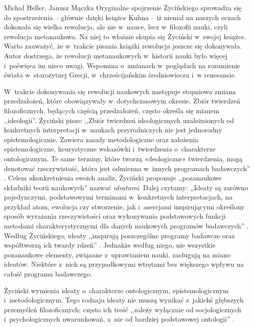 \begin{newrevplenv2auth}{Michał Heller, Janusz Mączka}
Oryginalne spojrzenie Życińskiego sprowadza się do spostrzeżenia -- głównie dzięki książce Kuhna -- iż niemal na naszych oczach dokonała się wielka rewolucja, ale nie w~nauce, lecz w~filozofii nauki, czyli rewolucja metanaukowa. Na niej to właśnie skupia się Życiński w~swojej książce. Warto zauważyć, że w~trakcie pisania książki rewolucja jeszcze się dokonywała. Autor dostrzega, że rewolucji metanaukowych w~historii nauki było więcej i~poświęca im nieco uwagi. Wspomina o~zmianach w~poglądach na rozumienie świata w~starożytnej Grecji, w~chrześcijańskim średniowieczu i~w renesansie.

W~trakcie dokonywania się rewolucji naukowych następuje stopniowa zmiana przedzałożeń, które obowiązywały w~dotychczasowym okresie. Zbiór twierdzeń filozoficznych, będących częścią przedzałożeń, często określa się mianem ,,ideologii''. Życiński pisze: ,,Zbiór twierdzeń ideologicznych uzależnionych od konkretnych interpretacji w~naukach przyrodniczych nie jest jednorodny epistemologicznie. Zawiera zasady metodologiczne oraz założenia epistemologiczne, heurystyczne wskazówki i~twierdzenia o~charakterze ontologicznym. Te same terminy, które tworzą «deologiczne» twierdzenia, mogą denotować rzeczywistość, która jest odmienna w~innych programach badawczych''
\parencite[][s.~33]{zycinski_struktura_2013}. %
 Celem ukonkretnienia swoich analiz, Życiński proponuje ,,pozanaukowe składniki teorii naukowych'' nazwać \textit{ideatami}. Dalej czytamy: ,,Ideaty są zarówno pojedynczymi, podstawowymi terminami w~konkretnych interpretacjach, na przykład atom, ewolucja czy stworzenie, jak i~asercjami inspirującymi określony sposób wyrażania rzeczywistości oraz wykonywania podstawowych funkcji metodami charakterystycznymi dla danych naukowych programów badawczych'' 
\parencite[][s.~34]{zycinski_struktura_2013}. %
 Według Życińskiego, ideaty ,,inspirują poszczególne programy badawcze oraz współtworzą ich twardy rdzeń'' 
\parencite[][s.~34]{zycinski_struktura_2013}. %
 Jednakże według niego, nie wszystkie pozanaukowe elementy, związane z~uprawianiem nauki, zasługują na miano ideatów. Niektóre z~nich są przypadkowymi wtrętami bez większego wpływu na całość programu badawczego.

Życiński wymienia ideaty o~charakterze ontologicznym, epistemologicznym i~metodologicznym. Tego rodzaju ideaty nie muszą wynikać z~jakichś głębszych przemyśleń filozoficznych; często ich treść ,,zależy wyłącznie od socjologicznych i~psychologicznych uwarunkowań, a~nie od bardziej podstawowej ontologii''
\parencite[][s.~51]{zycinski_struktura_2013}.%



\end{newrevplenv2auth}
